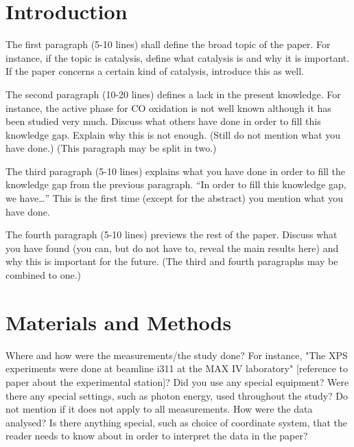 \documentclass[aps,prl,groupedaddress,twocolumn]{revtex4-1}
\begin{document}
\section{\label{intro}Introduction}
The first paragraph (5-10 lines) shall define the broad topic of the paper. For instance, if the topic is catalysis, define what catalysis is and why it is important. If the paper concerns a certain kind of catalysis, introduce this as well.

The second paragraph (10-20 lines) defines a lack in the present knowledge. For instance, the active phase for CO oxidation is not well known although it has been studied very much. Discuss what others have done in order to fill this knowledge gap. Explain why this is not enough. (Still do not mention what you have done.) (This paragraph may be split in two.)

The third paragraph (5-10 lines) explains what you have done in order to fill the knowledge gap from the previous paragraph. “In order to fill this knowledge gap, we have…” This is the first time (except for the abstract) you mention what you have done.

The fourth paragraph (5-10 lines) previews the rest of the paper. Discuss what you have found (you can, but do not have to, reveal the main results here) and why this is important for the future. (The third and fourth paragraphs may be combined to one.)

\section{Materials and Methods}
Where and how were the measurements/the study done? For instance, "The XPS experiments were done at beamline i311 at the MAX IV laboratory" [reference to paper about the experimental station]? Did you use any special equipment? Were there any special settings, such as photon energy, used throughout the study? Do not mention if it does not apply to all measurements. How were the data analysed? Is there anything special, such as choice of coordinate system, that the reader needs to know about in order to interpret the data in the paper?
\end{document}
